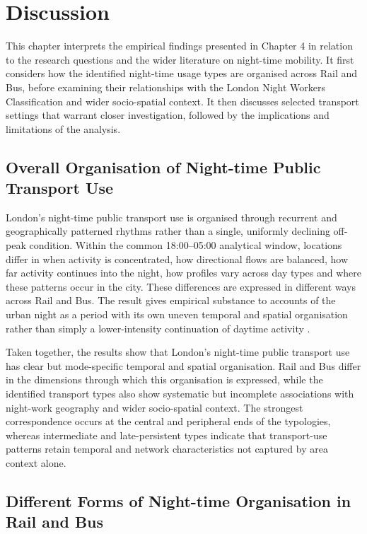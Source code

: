 \chapter{Discussion}
\label{chapterlabel5}

This chapter interprets the empirical findings presented in Chapter 4 in relation to the research questions and the wider literature on night-time mobility. It first considers how the identified night-time usage types are organised across Rail and Bus, before examining their relationships with the London Night Workers Classification and wider socio-spatial context. It then discusses selected transport settings that warrant closer investigation, followed by the implications and limitations of the analysis.

\section{Overall Organisation of Night-time Public Transport Use}

London's night-time public transport use is organised through recurrent and geographically patterned rhythms rather than a single, uniformly declining off-peak condition. Within the common 18:00--05:00 analytical window, locations differ in when activity is concentrated, how directional flows are balanced, how far activity continues into the night, how profiles vary across day types and where these patterns occur in the city. These differences are expressed in different ways across Rail and Bus. The result gives empirical substance to accounts of the urban night as a period with its own uneven temporal and spatial organisation rather than simply a lower-intensity continuation of daytime activity \citep{Schwanen2012,VanLiempt2015}.

Taken together, the results show that London's night-time public transport use has clear but mode-specific temporal and spatial organisation. Rail and Bus differ in the dimensions through which this organisation is expressed, while the identified transport types also show systematic but incomplete associations with night-work geography and wider socio-spatial context. The strongest correspondence occurs at the central and peripheral ends of the typologies, whereas intermediate and late-persistent types indicate that transport-use patterns retain temporal and network characteristics not captured by area context alone.

\section{Different Forms of Night-time Organisation in Rail and Bus}

